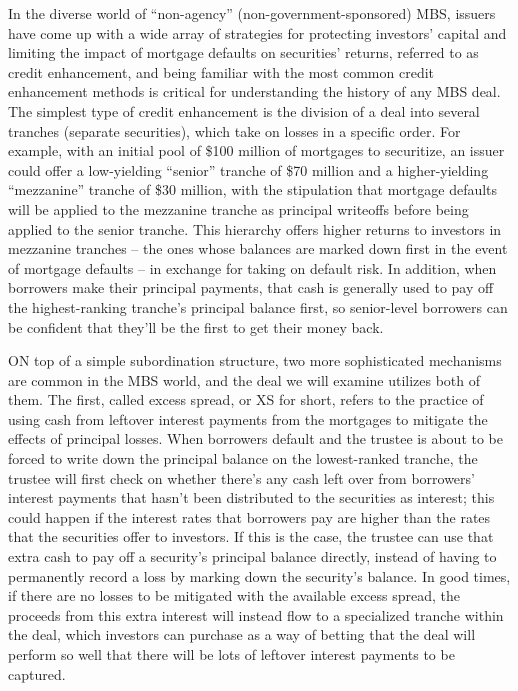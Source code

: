 \documentclass[12pt]{article}
\begin{document}
	
In the diverse world of “non-agency” (non-government-sponsored) MBS, issuers have come up with a wide array of strategies for protecting investors’ capital and limiting the impact of mortgage defaults on securities’ returns, referred to as credit enhancement, and being familiar with the most common credit enhancement methods is critical for understanding the history of any MBS deal. The simplest type of credit enhancement is the division of a deal into several tranches (separate securities), which take on losses in a specific order. For example, with an initial pool of \$100 million of mortgages to securitize, an issuer could offer a low-yielding “senior” tranche of \$70 million and a higher-yielding “mezzanine” tranche of \$30 million, with the stipulation that mortgage defaults will be applied to the mezzanine tranche as principal writeoffs before being applied to the senior tranche. This hierarchy offers higher returns to investors in mezzanine tranches – the ones whose balances are marked down first in the event of mortgage defaults – in exchange for taking on default risk. In addition, when borrowers make their principal payments, that cash is generally used to pay off the highest-ranking tranche’s principal balance first, so senior-level borrowers can be confident that they’ll be the first to get their money back.
	
ON top of a simple subordination structure, two more sophisticated mechanisms are common in the MBS world, and the deal we will examine utilizes both of them. The first, called excess spread, or XS for short, refers to the practice of using cash from leftover interest payments from the mortgages to mitigate the effects of principal losses. When borrowers default and the trustee is about to be forced to write down the principal balance on the lowest-ranked tranche, the trustee will first check on whether there’s any cash left over from borrowers’ interest payments that hasn’t been distributed to the securities as interest; this could happen if the interest rates that borrowers pay are higher than the rates that the securities offer to investors. If this is the case, the trustee can use that extra cash to pay off a security’s principal balance directly, instead of having to permanently record a loss by marking down the security’s balance. In good times, if there are no losses to be mitigated with the available excess spread, the proceeds from this extra interest will instead flow to a specialized tranche within the deal, which investors can purchase as a way of betting that the deal will perform so well that there will be lots of leftover interest payments to be captured.
	
\end{document}
